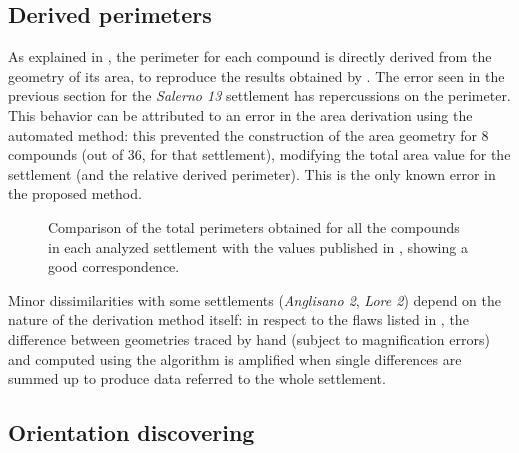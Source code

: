         \subsection{Derived perimeters}
            
            As explained in , the perimeter for each compound is directly derived from the geometry of its area, to reproduce the results obtained by \cite{laterza}. The error seen in the previous section for the \emph{Salerno 13} settlement has repercussions on the perimeter. This behavior can be attributed to an error in the area derivation using the automated method: this prevented the construction of the area geometry for 8 compounds (out of 36, for that settlement), modifying the total area value for the settlement (and the relative derived perimeter). This is the only known error in the proposed method.

            \begin{figure}[H]
                \centering
                \begin{tikzpicture}
                    
                \end{tikzpicture}
                \caption[Comparison of published perimeters with ones obtained with the proposed method.]{Comparison of the total perimeters obtained for all the compounds in each analyzed settlement with the values published in \cite{laterza}, showing a good correspondence.}
                \label{fig:graph-perim}
            \end{figure}

            Minor dissimilarities with some settlements (\emph{Anglisano 2}, \emph{Lore 2}) depend on the nature of the derivation method itself: in respect to the flaws listed in , the difference between geometries traced by hand (subject to magnification errors) and computed using the algorithm is amplified when single differences are summed up to produce data referred to the whole settlement.


        \subsection{Orientation discovering}

